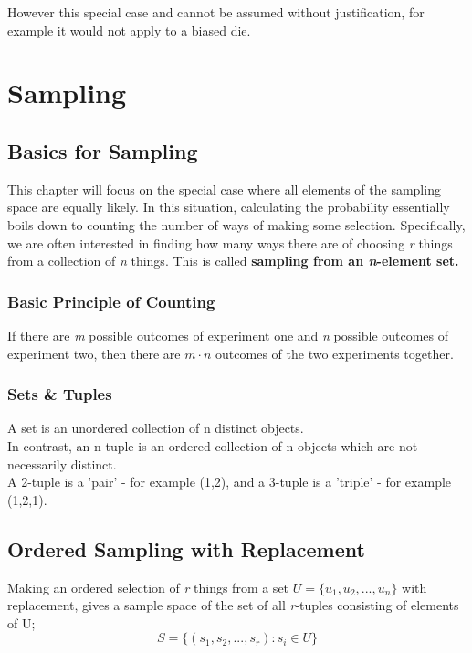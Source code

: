 \documentclass{report}
\begin{document}
However this special case and cannot be assumed without justification, for example it would not apply to a biased die. 

\chapter{Sampling}
\section{Basics for Sampling}

This chapter will focus on the special case where all elements of the sampling space are equally likely. In this situation, calculating the probability essentially boils down to counting the number of ways of making some selection. Specifically, we are often interested in finding how many ways there are of choosing \textit{r} things from a collection of \textit{n} things. This is called \textbf{sampling from an \textit{n}-element set.}

\subsection{Basic Principle of Counting}
If there are \textit{m} possible outcomes of experiment one and \textit{n} possible outcomes of experiment two, then there are $m \cdot n $ outcomes of the two experiments together.\\

\subsection{Sets \& Tuples}
A set is an unordered collection of n distinct objects.\\
In contrast, an n-tuple is an ordered collection of n objects which are not necessarily distinct.\\

A 2-tuple is a 'pair' - for example (1,2), and a 3-tuple is a 'triple' - for example (1,2,1).

\section{Ordered Sampling with Replacement}

Making an ordered selection of \textit{r} things from a set $U = \{u_1,u_2,...,u_n \} $ with replacement, gives a sample space of the set of all \textit{r}-tuples consisting of elements of U;
\begin{equation}
    S = \{(s_1,s_2,...,s_r) : s_i \in U \}
\end{equation}
\end{document}
